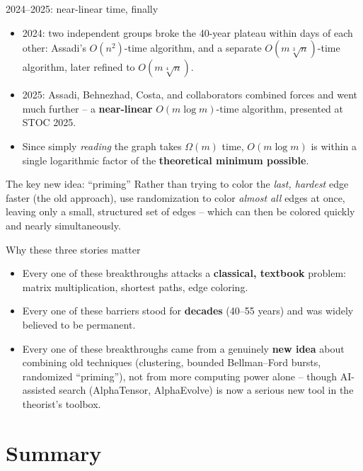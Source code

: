 \documentclass[11pt,aspectratio=169]{beamer}
\begin{document}
\begin{frame}{2024--2025: near-linear time, finally}
  \begin{itemize}
    \item 2024: two independent groups broke the 40-year plateau within days of each
    other: Assadi's $O(n^2)$-time algorithm, and a separate $O(m\sqrt[3]{n})$-time
    algorithm, later refined to $O(m\sqrt[4]{n})$.
    \item 2025: Assadi, Behnezhad, Costa, and collaborators combined forces and went
    much further -- a \textbf{near-linear} $O(m\log m)$-time algorithm, presented at
    \textsc{STOC} 2025.
    \item Since simply \emph{reading} the graph takes $\Omega(m)$ time, $O(m\log m)$ is
    within a single logarithmic factor of the \textbf{theoretical minimum possible}.
  \end{itemize}
  \begin{block}{The key new idea: ``priming''}
    Rather than trying to color the \emph{last, hardest} edge faster (the old approach),
    use randomization to color \emph{almost all} edges at once, leaving only a small,
    structured set of edges -- which can then be colored quickly and nearly
    simultaneously.
  \end{block}
\end{frame}

\begin{frame}{Why these three stories matter}
  \begin{itemize}
    \item Every one of these breakthroughs attacks a \textbf{classical, textbook}
    problem: matrix multiplication, shortest paths, edge coloring.
    \item Every one of these barriers stood for \textbf{decades} (40--55 years) and was
    widely believed to be permanent.
    \item Every one of these breakthroughs came from a genuinely \textbf{new idea} about
    combining old techniques (clustering, bounded Bellman--Ford bursts, randomized
    ``priming''), not from more computing power alone -- though AI-assisted search
    (AlphaTensor, AlphaEvolve) is now a serious new tool in the theorist's toolbox.
  \end{itemize}
\end{frame}

\section{Summary}
\end{document}

